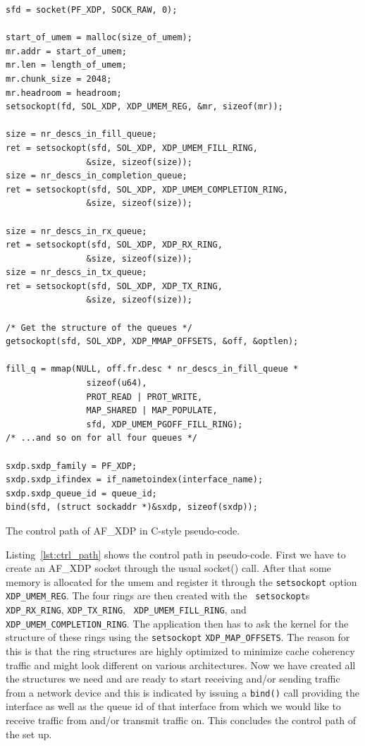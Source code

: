 \documentclass[9pt,numbers,reprint]{sigplanconf}
\begin{document}
\begin{listing}[p]
\centering
\begin{verbatim}
sfd = socket(PF_XDP, SOCK_RAW, 0);

start_of_umem = malloc(size_of_umem);
mr.addr = start_of_umem;
mr.len = length_of_umem;
mr.chunk_size = 2048;
mr.headroom = headroom;
setsockopt(fd, SOL_XDP, XDP_UMEM_REG, &mr, sizeof(mr));

size = nr_descs_in_fill_queue;
ret = setsockopt(sfd, SOL_XDP, XDP_UMEM_FILL_RING,
                &size, sizeof(size));
size = nr_descs_in_completion_queue;
ret = setsockopt(sfd, SOL_XDP, XDP_UMEM_COMPLETION_RING,
                &size, sizeof(size));

size = nr_descs_in_rx_queue;
ret = setsockopt(sfd, SOL_XDP, XDP_RX_RING,
                &size, sizeof(size));
size = nr_descs_in_tx_queue;
ret = setsockopt(sfd, SOL_XDP, XDP_TX_RING,
                &size, sizeof(size));

/* Get the structure of the queues */
getsockopt(sfd, SOL_XDP, XDP_MMAP_OFFSETS, &off, &optlen);

fill_q = mmap(NULL, off.fr.desc * nr_descs_in_fill_queue *
                sizeof(u64),
                PROT_READ | PROT_WRITE,
                MAP_SHARED | MAP_POPULATE,
                sfd, XDP_UMEM_PGOFF_FILL_RING);
/* ...and so on for all four queues */

sxdp.sxdp_family = PF_XDP;
sxdp.sxdp_ifindex = if_nametoindex(interface_name);
sxdp.sxdp_queue_id = queue_id;
bind(sfd, (struct sockaddr *)&sxdp, sizeof(sxdp));
\end{verbatim}
\caption{The control path of AF\_XDP in C-style pseudo-code.}
\label{lst:ctrl_path}
\end{listing}

Listing~\ref{lst:ctrl_path} shows the control path in
pseudo-code. First we have to create an AF\_XDP socket through the
usual socket() call. After that some memory is allocated for the umem
and register it through the {\tt setsockopt} option {\tt
  XDP\_UMEM\_REG}. The four rings are then created with the {\tt
  setsockopt}s {\tt XDP\_RX\_RING}, {\tt XDP\_TX\_RING}, {\tt
  XDP\_UMEM\_FILL\_RING}, and {\tt XDP\_UMEM\_COMPLETION\_RING}. The
application then has to ask the kernel for the structure of these
rings using the {\tt setsockopt} {\tt XDP\_MAP\_OFFSETS}. The reason
for this is that the ring structures are highly optimized to minimize
cache coherency traffic and might look different on various
architectures. Now we have created all the structures we need and are
ready to start receiving and/or sending traffic from a network device
and this is indicated by issuing a {\tt bind()} call providing the
interface as well as the queue id of that interface from which we
would like to receive traffic from and/or transmit traffic on. This
concludes the control path of the set up.
\end{document}
